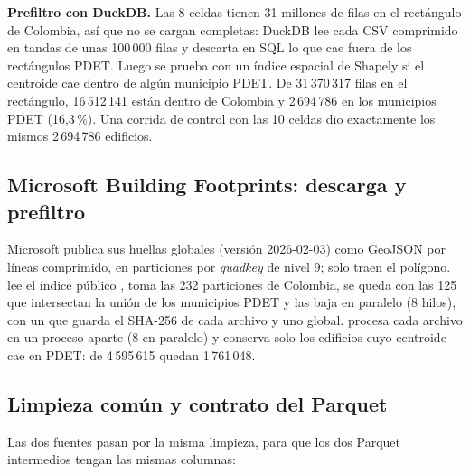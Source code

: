 \textbf{Prefiltro con DuckDB.} Las 8 celdas tienen 31 millones de filas en el
rectángulo de Colombia, así que no se cargan completas: DuckDB lee cada CSV
comprimido en tandas de unas 100\,000 filas y descarta en SQL lo que cae fuera
de los rectángulos PDET. Luego se prueba con un índice espacial de Shapely si
el centroide cae dentro de algún municipio PDET. De 31\,370\,317 filas en el
rectángulo, 16\,512\,141 están dentro de Colombia y 2\,694\,786 en los
municipios PDET (16,3\,\%). Una corrida de control con las 10 celdas dio
exactamente los mismos 2\,694\,786 edificios.


\subsection{Microsoft Building Footprints: descarga y prefiltro}
\label{sec:microsoft}

Microsoft publica sus huellas globales (versión 2026-02-03) como GeoJSON por
líneas comprimido, en particiones por \emph{quadkey} de nivel 9; solo traen el
polígono.  lee el índice público
, toma las 232 particiones de Colombia, se queda con
las 125 que intersectan la unión de los municipios PDET y las baja en paralelo
(8 hilos), con un  que guarda el SHA-256 de cada archivo y
uno global.  procesa cada archivo en un proceso
aparte (8 en paralelo) y conserva solo los edificios cuyo centroide cae en
PDET: de 4\,595\,615 quedan 1\,761\,048.


\subsection{Limpieza común y contrato del Parquet}
\label{sec:limpieza}

Las dos fuentes pasan por la misma limpieza, para que los dos Parquet
intermedios tengan las mismas columnas:

